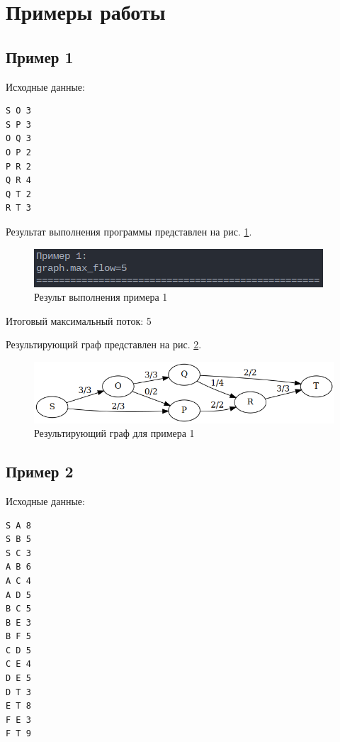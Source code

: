 \section{Примеры работы}

\subsection*{Пример 1}

Исходные данные:

\begin{lstlisting}
S O 3
S P 3
O Q 3
O P 2
P R 2
Q R 4
Q T 2
R T 3
\end{lstlisting}

Результат выполнения программы представлен на рис. \ref{fig:example_1}.

\begin{figure}[H]
    \centering
    \includegraphics[width=\linewidth]{photo/example_1}
    \caption{Результ выполнения примера 1}
    \label{fig:example_1}
\end{figure}

Итоговый максимальный поток: 5

Результирующий граф представлен на рис. \ref{fig:example_graph_1}.

\begin{figure}[H]
    \centering
    \includegraphics[width=\linewidth]{photo/example_graph_1}
    \caption{Результирующий граф для примера 1}
    \label{fig:example_graph_1}
\end{figure}

\subsection*{Пример 2}

Исходные данные:

\begin{lstlisting}
S A 8
S B 5
S C 3
A B 6
A C 4
A D 5
B C 5
B E 3
B F 5
C D 5
C E 4
D E 5
D T 3
E T 8
F E 3
F T 9
\end{lstlisting}

